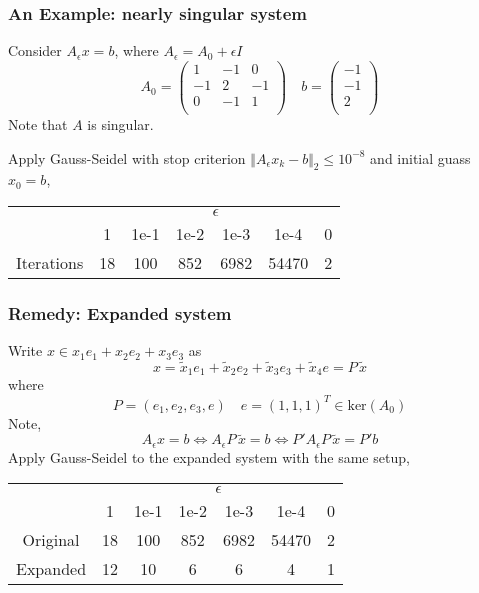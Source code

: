 \begin{frame}
\frametitle{An Example: nearly singular system}
Consider $A_{\epsilon}x=b$, where $A_{\epsilon}=A_0+\epsilon I$
\begin{equation*}
A_0=\left(
    \begin{array}{rrr}
    1 & -1 & 0\\
    -1&  2 &-1\\
    0 & -1 & 1\\
    \end{array}
\right)
\quad
b=\left(
    \begin{array}{r}
    -1\\
    -1\\
    2\\
    \end{array}
\right)
\end{equation*}
Note that $A$ is singular. 

Apply Gauss-Seidel with stop criterion 
$\Vert A_{\epsilon}x_k-b\Vert_2 \le 10^{-8}$
and initial guass $x_{0}=b$,
\begin{table}
\centering
\begin{tabular}{ccccccc}
\toprule
&\multicolumn{6}{c}{$\epsilon$}\\
\cmidrule{2-7}
& 1 & 1e-1 & 1e-2 & 1e-3 & 1e-4 & 0 \\
\midrule
Iterations &18 &100 &852 & 6982 & 54470 &2\\
\bottomrule
\end{tabular}
\end{table}
\end{frame}

\begin{frame}
\frametitle{Remedy: Expanded system}
Write $x \in x_1 e_1 +x_2 e_2 +x_3 e_3$ as 
$$x=\tilde{x}_1 e_1 +\tilde{x}_2 e_2 +\tilde{x}_3 e_3 +\tilde{x}_4 e
=P\,\tilde{x}$$
where 
$$P=(e_1, e_2, e_3, e)\quad e=(1,1,1)^T \in \text{ker}(A_0)$$
Note,
$$A_{\epsilon}x=b \Longleftrightarrow 
A_{\epsilon}P\,\tilde{x}=b \Longleftrightarrow 
P'A_{\epsilon}P\,\tilde{x}=P'b
$$ 
Apply Gauss-Seidel to the expanded system with the same setup, 
\begin{table}
\centering
\begin{tabular}{ccccccc}
\toprule
&\multicolumn{6}{c}{$\epsilon$}\\
\cmidrule{2-7}
& 1 & 1e-1 & 1e-2 & 1e-3 & 1e-4 & 0 \\
\midrule
Original &18 &100 &852 & 6982 & 54470 &2\\
Expanded &12 &10  &6   & 6    & 4     &1\\
\bottomrule
\end{tabular}
\end{table}
\end{frame}